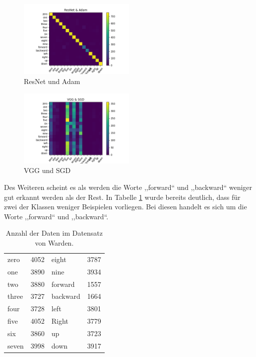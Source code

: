 \documentclass[sigconf]{acmart}
\begin{document}
\newpage

\begin{figure}[ht]
  \includegraphics[width=0.5\textwidth]{images/Confusion-Matrix_ResNet_Adam}
  \caption{ResNet und Adam}
  \Description{}
  \label{fig:Confusion-Matrix_ResNet_Adam}
\end{figure} 

\begin{figure}[ht]
  \includegraphics[width=0.5\textwidth]{images/Confusion-Matrix_VGG_SGD}
  \caption{VGG und SGD}
  \Description{}
  \label{fig:Confusion-Matrix_VGG_SGD}
\end{figure} 

\noindent Des Weiteren scheint es als werden die Worte ,,forward“ und ,,backward“ weniger gut erkannt werden als der Rest. In Tabelle \ref{table:data} wurde bereits deutlich, dass für zwei der Klassen weniger Beispielen vorliegen. Bei diesen handelt es sich um die Worte ,,forward“ und ,,backward“.
\newline
\newline

\begin{table}[ht]
\centering
\begin{tabular}{llll}
zero & 4052 & eight & 3787  \\
one & 3890 & nine & 3934  \\
two & 3880 & forward & 1557  \\
three &  3727 & backward & 1664 \\
four & 3728 & left & 3801 \\
five & 4052 & Right & 3779\\
six & 3860 & up & 3723\\
seven & 3998 & down & 3917 
\end{tabular}
\caption{Anzahl der Daten im Datensatz von Warden\cite{speechcommandsv2}.}
\label{table:data}
\end{table}
\end{document}
